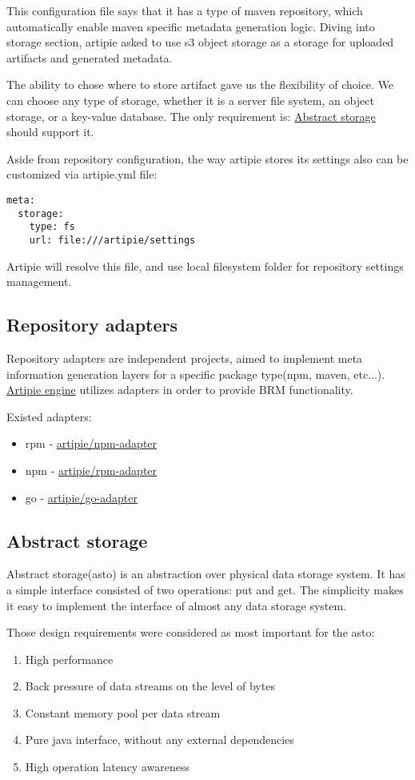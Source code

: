 \documentclass[12pt,oneside]{article}
\begin{document}
This configuration file says that it has a type of maven repository,
which automatically enable maven specific metadata generation logic.
Diving into storage section, artipie asked to use s3 object storage 
as a storage for uploaded artifacts and generated metadata.   

The ability to chose where to store artifact gave us the flexibility of choice.
We can choose any type of storage, whether it is a server file system,
an object storage, or a key-value database.
The only requirement is: \hyperref[sec:asto]{Abstract storage} should support it.

Aside from repository configuration, the way artipie stores its settings
also can be customized via artipie.yml file:
\begin{Verbatim}[tabsize=2]
meta:
  storage:
    type: fs
    url: file:///artipie/settings
\end{Verbatim}
Artipie will resolve this file, and use local filesystem folder for repository settings management. 

\subsection{Repository adapters}
Repository adapters are independent projects, 
aimed to implement meta information generation
layers for a specific package type(npm, maven, etc...).
\hyperref[sec:arti-engine]{Artipie engine} utilizes adapters in order to provide BRM functionality.

Existed adapters:
\begin{itemize}
	\item rpm - \href{https://github.com/artipie/npm-adapter}{artipie/npm-adapter}
	\item npm - \href{https://github.com/artipie/rpm-adapter}{artipie/rpm-adapter}
	\item go - \href{https://github.com/artipie/go-adapter}{artipie/go-adapter}
\end{itemize}

\subsection{Abstract storage}
\label{sec:asto}
Abstract storage(asto) is an abstraction over physical data storage system.
It has a simple interface consisted of two operations: put and get.
The simplicity makes it easy to implement the interface of almost any data storage system.

Those design requirements were considered as most important for the asto: 
\begin{enumerate}
  \item High performance
  \item Back pressure of data streams on the level of bytes
	\item Constant memory pool per data stream
	\item Pure java interface, without any external dependencies
	\item High operation latency awareness
\end{enumerate}
\end{document}
